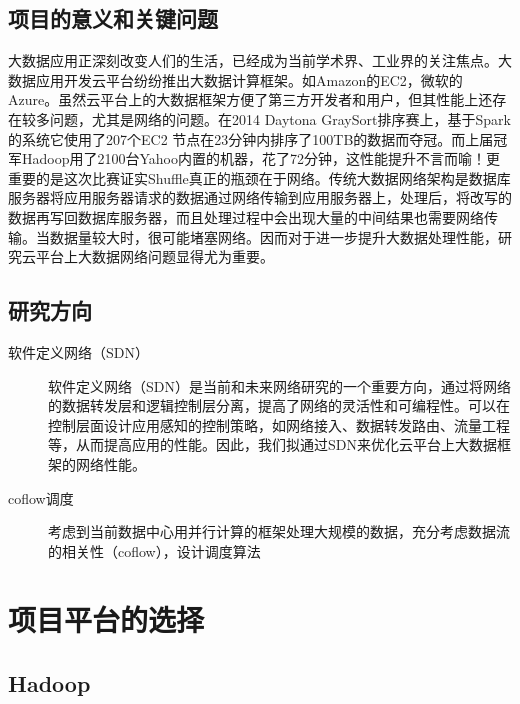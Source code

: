 \documentclass[a4paper, 11pt]{article}                                                   %
\begin{document}
\begin{CJK*}{UTF8}{song}
\subsection{项目的意义和关键问题}
大数据应用正深刻改变人们的生活，已经成为当前学术界、工业界的关注焦点。大数据应用开发云平台纷纷推出大数据计算框架。如Amazon的EC2，微软的Azure。虽然云平台上的大数据框架方便了第三方开发者和用户，但其性能上还存在较多问题，尤其是网络的问题。在2014 Daytona GraySort排序赛上，基于Spark的系统它使用了207个EC2 节点在23分钟内排序了100TB的数据而夺冠。而上届冠军Hadoop用了2100台Yahoo内置的机器，花了72分钟，这性能提升不言而喻！更重要的是这次比赛证实Shuffle真正的瓶颈在于网络。传统大数据网络架构是数据库服务器将应用服务器请求的数据通过网络传输到应用服务器上，处理后，将改写的数据再写回数据库服务器，而且处理过程中会出现大量的中间结果也需要网络传输。当数据量较大时，很可能堵塞网络。因而对于进一步提升大数据处理性能，研究云平台上大数据网络问题显得尤为重要。\\
\subsection{研究方向}
\begin{description}
  \item[软件定义网络（SDN）] 软件定义网络（SDN）是当前和未来网络研究的一个重要方向，通过将网络的数据转发层和逻辑控制层分离，提高了网络的灵活性和可编程性。可以在控制层面设计应用感知的控制策略，如网络接入、数据转发路由、流量工程等，从而提高应用的性能。因此，我们拟通过SDN来优化云平台上大数据框架的网络性能。
  \item[coflow调度] 考虑到当前数据中心用并行计算的框架处理大规模的数据，充分考虑数据流的相关性（coflow），设计调度算法
\end{description}
\section{项目平台的选择}
\subsection{Hadoop}

\end{CJK*}
\end{document}
